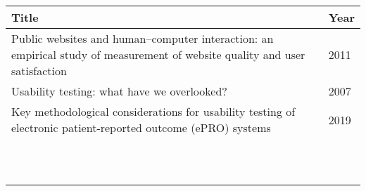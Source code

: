 \begin{table}[H]
\begin{tabular}{ll}
\hline
\textbf{Title} & \textbf{Year} \\ \hline
Public websites and human–computer interaction: an empirical study of measurement of website quality and user satisfaction & 2011 \\
Usability testing: what have we overlooked? & 2007 \\
Key methodological considerations for usability testing of electronic patient-reported outcome (ePRO) systems & 2019 \\
               &               \\
               &               \\
               &               \\
               &               \\
               &               \\
               &               \\
               &               \\
               &               \\
               &               \\
               &               \\
               &               \\ \hline
\end{tabular}
\end{table}



